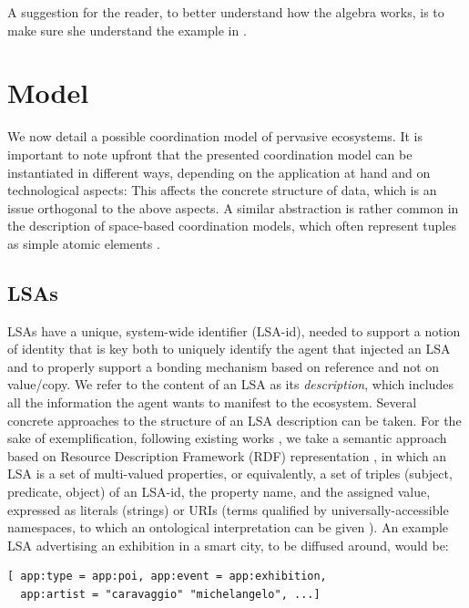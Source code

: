 \documentclass[12pt,a4paper,twoside,openright]{book}
\begin{document}
A suggestion for the reader, to better understand how the algebra works, is to make sure she understand the example in .

\section{Model}

We now detail a possible coordination model of pervasive ecosystems.
%
It is important to note upfront that the presented coordination model can be instantiated in different ways, depending on the application at hand and on technological aspects: This affects the concrete structure of data, which is an issue orthogonal to the above aspects.
%
A similar abstraction is rather common in the description of space-based coordination models, which often represent tuples as simple atomic elements \cite{zavattaro}.

\subsection{LSAs}

LSAs have a unique, system-wide identifier (LSA-id), needed to support a notion of identity that is key both to uniquely identify the agent that injected an LSA and to properly support a bonding mechanism based on reference and not on value/copy. We refer to the content of an LSA as its \emph{description}, which includes all the information the agent wants to manifest to the ecosystem.
%
Several concrete approaches to the structure of an LSA description can be taken.
%
For the sake of exemplification, following existing works \cite{SemanticSapereIGI2012,sapereecolaws-sac2012,SemMatchingSAC2013}, we take a semantic approach based on Resource Description Framework (RDF) representation \cite{manola2004primer}, in which an LSA is a set of multi-valued properties, or equivalently, a set of triples (subject, predicate, object) of an LSA-id, the property name, and the assigned value, expressed as literals (strings) or URIs (terms qualified by universally-accessible namespaces, to which an ontological interpretation can be given \cite{ranganathan2004ontologies}).
%
An example LSA advertising an exhibition in a smart city, to be diffused around, would be: 

{\begin{Verbatim}[samepage=true,frame=single,commandchars=\\\{\}]
[ app:type = app:poi, app:event = app:exhibition,
  app:artist = "caravaggio" "michelangelo", ...]
\end{Verbatim}
}
\end{document}
